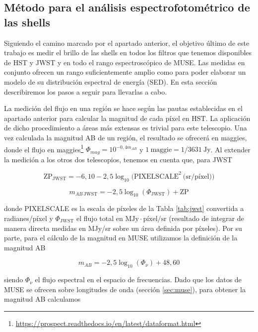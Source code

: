 \subsection{Método para el análisis espectrofotométrico de las shells} \label{sec:metodoespectro}
Siguiendo el camino marcado por el apartado anterior, el objetivo último de este trabajo es medir el brillo de las shells en todos los filtros que tenemos disponibles de HST y JWST y en todo el rango espectroscópico de MUSE. Las medidas en conjunto ofrecen un rango suficientemente amplio como para poder elaborar un modelo de su distribución espectral de energía (SED). En esta sección describiremos los pasos a seguir para llevarlas a cabo. \par

La medición del flujo en una región se hace según las pautas establecidas en el apartado anterior para calcular la magnitud de cada píxel en HST. La aplicación de dicho procedimiento a áreas más extensas es trivial para este telescopio. Una vez calculada la magnitud AB de un región, el resultado se ofrecerá en maggies, donde el flujo en maggies\footnote{\url{https://prospect.readthedocs.io/en/latest/dataformat.html}} \(\Phi_{mag} = 10^{-0,4 m_{AB}}\) y \(1 \: \text{maggie} = 1/3631 \: \text{Jy}\). Al extender la medición a los otros dos telescopios, tenemos en cuenta que, para JWST

\begin{equation}
     \text{ZP}_{\text{JWST}} = -6,10 - 2,5\log_{10}{\text{(PIXELSCALE}^{2} \: \text{(sr/píxel)})}
\end{equation}

\begin{equation}
    m_{AB\: \text{JWST}} = - 2,5\log_{10}{(\Phi_{\text{JWST}})} + \text{ZP}
\end{equation}

donde PIXELSCALE es la escala de píxeles de la Tabla \ref{tab:jwst} convertida a radianes/píxel y \(\Phi_{\text{JWST}}\) el flujo total en \(\text{MJy}\cdot \text{píxel}/\text{sr}\) (resultado de integrar de manera directa medidas en MJy/sr sobre un área definida por píxeles). Por su parte, para el cálculo de la magnitud en MUSE utilizamos la definición de la magnitud AB \citep{okeSecondaryStandardStars1983}

\begin{equation}
    m_{AB} = - 2,5\log_{10}{(\Phi_{\nu})} + 48,60
\end{equation}

siendo \(\Phi_\nu\) el flujo espectral en el espacio de frecuencias. Dado que los datos de MUSE se ofrecen sobre longitudes de onda (sección \ref{sec:muse}), para obtener la magnitud AB calculamos

